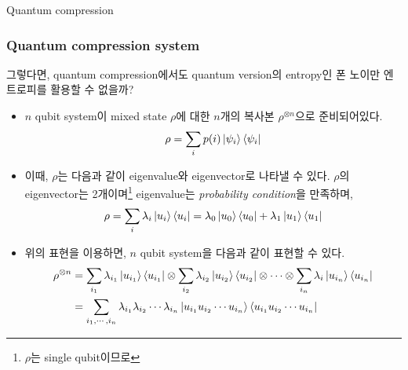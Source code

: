 \documentclass[9pt]{beamer}
\begin{document}
    \begin{section}{Quantum compression}
        \begin{frame}
            \frametitle{Quantum compression system}
            그렇다면, quantum compression에서도 quantum version의 entropy인 폰 노이만 엔트로피를 활용할 수 없을까?
            \begin{itemize}
                \item $n$ qubit system이 mixed state $\rho$에 대한 $n$개의 복사본 $\rho^{\otimes n}$으로 준비되어있다.
                \begin{equation*}
                    \rho = \sum_i p(i) \ket{\psi_i} \bra{\psi_i}
                \end{equation*}
                \item 이때, $\rho$는 다음과 같이 eigenvalue와 eigenvector로 나타낼 수 있다. $\rho$의 eigenvector는 2개이며\footnote{$\rho$는 single qubit이므로} eigenvalue는 \textit{probability condition}을 만족하며,
                \begin{equation*}
                    \rho = \sum_i\lambda_i\ket{u_i} \bra{u_i} = \lambda_0\ket{u_0} \bra{u_0} + \lambda_1\ket{u_1} \bra{u_1}
                \end{equation*}
                \item 위의 표현을 이용하면, $n$ qubit system을 다음과 같이 표현할 수 있다.
                \begin{align*}
                    \rho^{\otimes n}&=  \sum_{i_1}\lambda_{i_1}\ket{u_{i_1}}\bra{u_{i_1}} \otimes  \sum_{i_2}\lambda_{i_2}\ket{u_{i_2}} \bra{u_{i_2}} \otimes \cdots \otimes  \sum_{i_n}\lambda_i\ket{u_{i_n}} \bra{u_{i_n}}\\ 
                                    &= \sum_{i_1, \cdots, i_n} \lambda_{i_1} \lambda_{i_2} \cdots \lambda_{i_n} \ket{u_{i_1} u_{i_2} \cdots u_{i_n}}\bra{u_{i_1} u_{i_2} \cdots u_{i_n}}
                \end{align*}
            \end{itemize}
        \end{frame}


\end{section}
\end{document}
